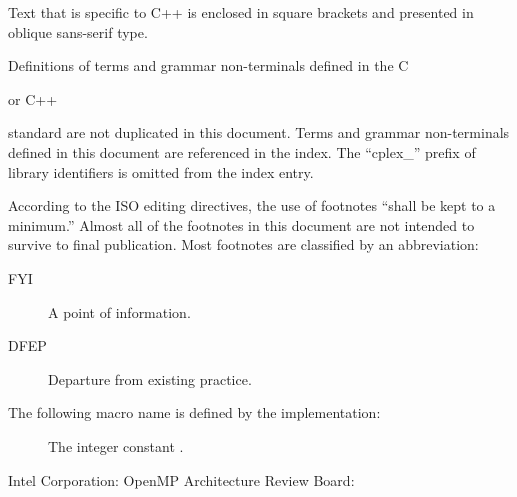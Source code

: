 \documentclass[
	techspec,	%
	final,		%
	notcopyright,	%
	letterpaper	%
	]{isov2}
\begin{document}
\pnum
\begin{cpp}
Text that is specific to C++
is enclosed in square brackets
and presented in oblique sans-serif type.
\end{cpp}

\pnum
Definitions of terms and grammar non-terminals defined in the C
\begin{cpp}
or C++
\end{cpp}
standard are not duplicated in this document.
Terms and grammar non-terminals defined in this document
are referenced in the index.
The ``cplex_'' prefix of library identifiers
is omitted from the index entry.

\pnum
According to the ISO editing directives,
the use of footnotes
``shall be kept to a minimum.''
Almost all of the footnotes in this document
are not intended to survive to final publication.
Most footnotes are classified by an abbreviation:
\begin{description}
\item[FYI]
A point of information.
\item[DFEP]
Departure from existing practice.
\end{description}

\begin{comment}
\pnum
Annex A contains information
concerning the editing of the LaTeX source of this document.
It will not survive to final publication.
\end{comment}


\pnum
The following macro name is defined by the implementation:

\begin{description}
\item[]
The integer constant \tcode{\Year\Mo}.
\end{description}
















\bibannex
\begin{references}
{Intel Corporation}:
{OpenMP Architecture Review Board}:
\end{references}

\printindex
\end{document}

